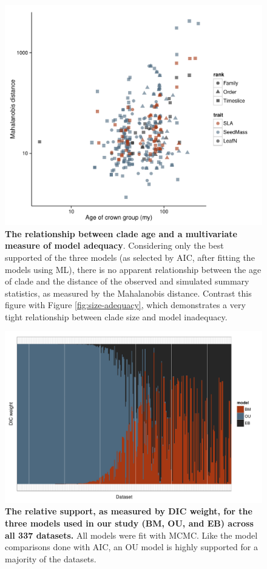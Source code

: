 \documentclass[a4paper,12pt]{article}
\begin{document}
\begin{figure}[p]
  \centering
  \includegraphics[scale=0.9]{figs/ad-age-ml}
  \caption{\textbf{The relationship between clade age and a multivariate measure of model adequacy}. Considering only the best supported of the three models (as selected by AIC, after fitting the models using ML), there is no  apparent relationship between the age of clade and the distance of the observed and simulated summary statistics, as measured by the Mahalanobis distance. Contrast this figure with Figure \ref{fig:size-adequacy}, which demonstrates a very tight relationship between clade size and model inadequacy.}
  \label{fig:supp-age-ml}
\end{figure}

\begin{figure}[p]
  \centering
  \includegraphics[angle=90, origin=c, scale=0.8]{figs/dic-support}
  \caption{\textbf{The relative support, as measured by DIC weight, for the three models used in our study (BM, OU, and EB) across all 337 datasets.} All models were fit with MCMC. Like the model comparisons done with AIC, an OU model is highly supported for a majority of the datasets.}
  \label{fig:supp-dic-support}
\end{figure}
\end{document}
